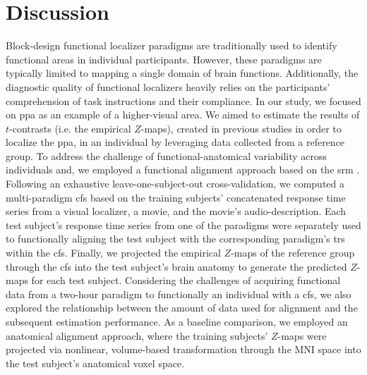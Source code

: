 \section{Discussion}


%
Block-design functional localizer paradigms are traditionally used to identify
functional areas in individual participants.
%
However, these paradigms are typically limited to mapping a single domain of
brain functions.
%
Additionally, the diagnostic quality of functional localizers heavily relies on
the participants' comprehension of task instructions and their compliance.
%
In our study, we focused on \ac{ppa} as an example of a higher-visual area.
%
We aimed to estimate the results of $t$-contrasts (i.e. the empirical $Z$-maps),
created in previous studies \citep{sengupta2016extension,
haeusler2022processing} in order to localize the \ac{ppa}, in an individual by
leveraging data collected from a reference group.
%
To address the challenge of functional-anatomical variability across individuals
and, we employed a functional alignment approach based on the \acf{srm}
\citep{chen2015reduced}.
%
Following an exhaustive leave-one-subject-out cross-validation, we computed a
multi-paradigm \acf{cfs} based on the training subjects' concatenated response
time series from a visual localizer, a movie, and the movie's audio-description.
%
Each test subject's response time series from one of the paradigms were
separately used to functionally aligning the test subject with the corresponding
paradigm's \acp{tr} within the \ac{cfs}.
%
Finally, we projected the empirical $Z$-maps of the reference group through the
\ac{cfs} into the test subject's brain anatomy to generate the predicted
$Z$-maps for each test subject.
%
Considering the challenges of acquiring functional data from a two-hour paradigm
to functionally an individual with a \ac{cfs}, we also explored the relationship
between the amount of data used for alignment and the subsequent estimation
performance.
%
As a baseline comparison, we employed an anatomical alignment approach, where
the training subjects' $Z$-maps were projected via nonlinear, volume-based
transformation through the MNI space into the test subject's anatomical voxel
space.


